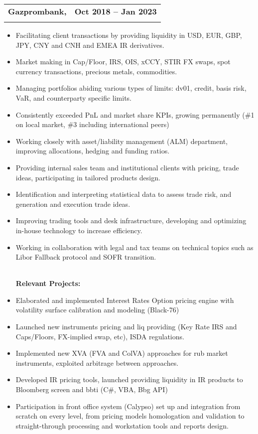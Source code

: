 \documentclass[letterpaper,hidelinks]{article}
\makeatletter
\newcommand{\resumeItemRoutine}[1]{
  \item[\small\ding{223}]\small{
    {#1 \vspace{-2pt}}
  }
}
\newcommand{\resumeItemProject}[1]{
  \item[\small\ding{51}]\small{
    {#1 \vspace{-2pt}}
  }
}
\newcommand{\resumeSubheading}[4]{
  \vspace{-2pt}\item
    \begin{tabular*}{0.97\textwidth}[t]{l@{\extracolsep{\fill}}r}
      \textbf{#1} & #2 \\
      \text{\small#3} & \text{\small #4} \\
    \end{tabular*}\vspace{-7pt}
}
\newcommand{\resumeItemListStart}{\begin{itemize}}
\newcommand{\resumeItemListEnd}{\end{itemize}\vspace{-5pt}}
\makeatother
\begin{document}
\resumeSubheading
{\textbf{\large{Gazprombank,}\small\normalfont{ one of the largest domestic banks with an extensive international market presence}}}{\textbf{Oct 2018 \textbf{--} Jan 2023}}
{\textbf{FI and IR Trader | Fixed Income, Currencies and Commodities desk, Capital Markets}}{\textbf{Moscow, RF}}

\vspace{1pt}
\resumeItemListStart
\resumeItemRoutine{Facilitating client transactions by providing liquidity in USD, EUR, GBP, JPY, CNY and CNH and EMEA IR derivatives.}
\resumeItemRoutine{Market making in Cap/Floor, IRS, OIS, xCCY, STIR FX swaps, spot currency transactions, precious metals, commodities.}
\resumeItemRoutine{Managing portfolios abiding various types of limits: dv01, credit, basis risk, VaR, and counterparty specific limits.}
\resumeItemRoutine{Consistently exceeded PnL and market share KPIs, growing permanently (\#1 on local market, \#3 including international peers)}
\resumeItemRoutine{Working closely with asset/liability management (ALM) department, improving allocations, hedging and funding ratios.}
\resumeItemRoutine{Providing internal sales team and institutional clients with pricing, trade ideas, participating in tailored products design.}
\resumeItemRoutine{Identification and interpreting statistical data to assess trade risk, and generation and execution trade ideas.}
\resumeItemRoutine{Improving trading tools and desk infrastructure, developing and optimizing in-house technology to increase efficiency.}
\resumeItemRoutine{Working in collaboration with legal and tax teams on technical topics such as Libor Fallback protocol and SOFR transition.}
\vspace{2pt}\\
\hspace{-13pt}\textbf{Relevant Projects:}
\vspace{-3pt}
\resumeItemProject{Elaborated and implemented Interest Rates Option pricing engine with volatility surface calibration and modeling (Black-76)}
\resumeItemProject{Launched new instruments pricing and liq providing (Key Rate IRS and Caps/Floors, FX-implied swap, etc), ISDA regulations.}
\resumeItemProject{Implemented new XVA (FVA and ColVA) approaches for rub market instruments, exploited arbitrage between approaches.}
\resumeItemProject{Developed IR pricing tools, launched providing liquidity in IR products to Bloomberg screen and bbti (C\#, VBA, Bbg API)}
\resumeItemProject{Participation in front office system (Calypso) set up and integration from scratch on every level, from pricing models homologation and validation to straight-through processing and workstation tools and reports design.}
\resumeItemListEnd
\end{document}
